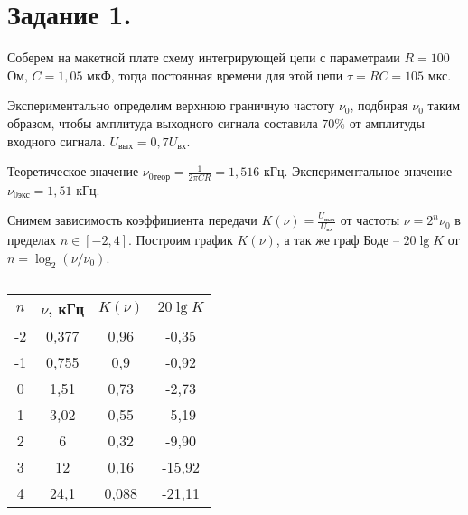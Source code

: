 


	
	
	\section*{Задание 1.}
	
	\noindent Соберем на макетной плате схему интегрирующей цепи с параметрами $R = 100$ Ом, $C = 1,05$ мкФ, тогда постоянная времени для этой цепи $\tau = R C = 105$ мкс.
	
	\noindent Экспериментально определим верхнюю граничную частоту $\nu_0$, подбирая $\nu_0$ таким образом, чтобы амплитуда выходного сигнала составила $70 \%$ от амплитуды входного сигнала. $U_{\text{вых}} = 0,7 U_{\text{вх}}$.
	
	\noindent Теоретическое значение $\nu_{\text{0теор}} = \frac{1}{2 \pi C R} = 1,516$ кГц. Экспериментальное значение $\nu_{\text{0экс}} = 1,51$ кГц.
	
	
	\noindent Снимем зависимость коэффициента передачи $K(\nu) = \frac{U_{\text{вых}}}{U_{\text{вх}}}$ от частоты $\nu = 2^n \nu_0$ в пределах $n \in [-2, 4]$. Построим график $K(\nu)$, а так же граф Боде -- $20 \lg K$ от $n = \log_2 (\nu / \nu_0)$.

	\begin{table}[h!]
		\begin{center}
			\begin{tabular}{|c|c|c|c|}
				\hline
				$n$& $\nu$, кГц & $K(\nu)$ &  $20 \lg K$      \\ \hline
				-2 & 0,377      & 0,96     & -0,35  \\ \hline
				-1 & 0,755      & 0,9      & -0,92  \\ \hline
				0  & 1,51       & 0,73     & -2,73  \\ \hline
				1  & 3,02       & 0,55     & -5,19  \\ \hline
				2  & 6          & 0,32     & -9,90  \\ \hline
				3  & 12         & 0,16     & -15,92 \\ \hline
				4  & 24,1       & 0,088    & -21,11 \\ \hline
			\end{tabular}
		\end{center}
		\caption{}
	\end{table}

